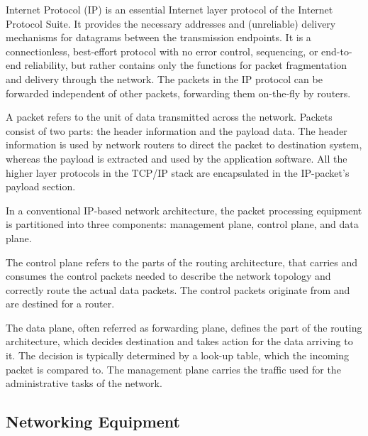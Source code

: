 Internet Protocol (IP) is an essential Internet layer protocol of the Internet Protocol Suite. It provides the necessary addresses and (unreliable) delivery mechanisms for datagrams between the transmission endpoints. It is a connectionless, best-effort protocol with no error control, sequencing, or end-to-end reliability, but rather contains only the functions for packet fragmentation and delivery through the network. The packets in the IP protocol can be forwarded independent of other packets, forwarding them on-the-fly by routers.

A packet refers to the unit of data transmitted across the network. Packets consist of two parts: the header information and the payload data. The header information is used by network routers to direct the packet to destination system, whereas the payload is extracted and used by the application software. All the higher layer protocols in the TCP/IP stack are encapsulated in the IP-packet's payload section.

In a conventional IP-based network architecture, the packet processing equipment is partitioned into three components: management plane, control plane, and data plane.

The control plane refers to the parts of the routing architecture, that carries and consumes the control packets needed to describe the network topology and correctly route the actual data packets. The control packets originate from and are destined for a router.~\cite{Chao:2007:HPS:1202844, Yang:2004:FCE}

The data plane, often referred as forwarding plane, defines the part of the routing architecture, which decides destination and takes action for the data arriving to it. The decision is typically determined by a look-up table, which the incoming packet is compared to. The management plane carries the traffic used for the administrative tasks of the network.~\cite{Chao:2007:HPS:1202844, Yang:2004:FCE}

\subsection{Networking Equipment}



